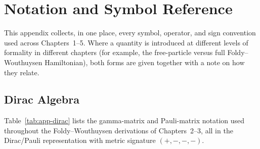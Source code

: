 \documentclass[main]{subfiles}
\begin{document}
\ifSubfilesClassLoaded{\appendix\setcounter{chapter}{0}}{}
\chapter{Notation and Symbol Reference}
\label{app:notation}

This appendix collects, in one place, every symbol, operator, and sign
convention used across Chapters~1--5. Where a quantity is introduced at
different levels of formality in different chapters (for example, the
free-particle versus full Foldy--Wouthuysen Hamiltonian), both forms are
given together with a note on how they relate.

\section{Dirac Algebra}

Table~\ref{tab:app-dirac} lists the gamma-matrix and Pauli-matrix notation
used throughout the Foldy--Wouthuysen derivations of Chapters~2--3, all in
the Dirac/Pauli representation with metric signature $(+,-,-,-)$.
\end{document}
